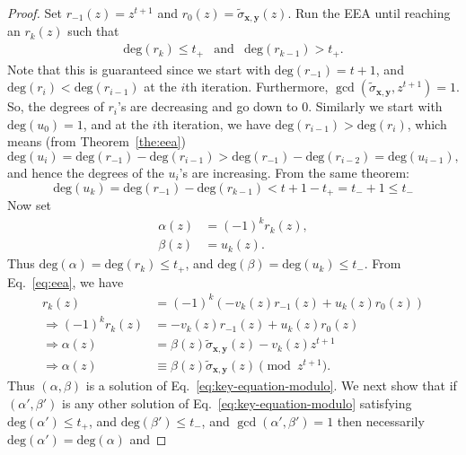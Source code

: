 \documentclass[pdflatex,sn-mathphys-num]{sn-jnl}
\theoremstyle{definition}
\newcommand{\vtr}[1]{\mathbf{#1}}
\begin{document}
 \begin{proof}
 Set $r_{-1}(z) = z^{t+1}$ and $r_0(z) = \tilde{\sigma}_{\vtr{x}, \vtr{y}}(z)$. Run the EEA until reaching an $r_k(z)$ such that
 \[
 \begin{matrix}
     \text{deg}(r_{k}) \leq t_+ & \text{and} & \text{deg}(r_{k-1}) > t_+. 
 \end{matrix}
 \]
 Note that this is guaranteed since we start with $\text{deg}(r_{-1}) = t+1$, and  $\text{deg}(r_{i})  < \text{deg}(r_{i-1})$  at the $i$th iteration. Furthermore, $\gcd(\tilde{\sigma}_{\vtr{x}, \vtr{y}}, z^{t+1}) = 1$. So, the degrees of $r_i$'s are decreasing and go down to 0. Similarly we start with $\text{deg}(u_{0}) = 1$, and at the $i$th iteration, we have $\text{deg}(r_{i-1}) > \text{deg}(r_{i})$, which means (from Theorem~\ref{the:eea})
 \[ 
    \text{deg}(u_{i}) = \text{deg}(r_{-1}) - \text{deg}(r_{i-1}) > \text{deg}(r_{-1}) - \text{deg}(r_{i-2}) =  \text{deg}(u_{i-1}),
\]
and hence the degrees of the $u_i$'s are increasing. From the same theorem: 
\begin{equation}
\label{eq:uk-less-than-tminus}
 \text{deg}(u_k) = \text{deg}(r_{-1}) - \text{deg}(r_{k-1}) < t + 1 - t_{+} = t_{-} + 1 \leq t_{-}   
\end{equation}
Now set 
 \begin{align}
     \alpha(z) &= (-1)^k r_k(z), \nonumber\\
     \beta(z) &= u_k(z) \label{eq:ab}.
 \end{align}
Thus $\text{deg}(\alpha) = \text{deg}(r_{k}) \leq t_+$, and $\text{deg}(\beta) = \text{deg}(u_{k}) \leq t_-$. From Eq.~\eqref{eq:eea}, we have
\begin{align}
    r_k(z) &= (-1)^k (-v_k(z)r_{-1}(z) + u_k(z) r_0(z)) \nonumber\\
\Rightarrow    (-1)^k r_k(z) &= -v_k(z)r_{-1}(z) + u_k(z) r_0(z) \nonumber\\
\Rightarrow   \alpha(z) &= \beta(z) \tilde{\sigma}_{\vtr{x}, \vtr{y}}(z) -v_k(z)z^{t+1}  \nonumber\\
\Rightarrow \alpha(z) &\equiv \beta(z) \tilde{\sigma}_{\vtr{x}, \vtr{y}}(z) \pmod{z^{t+1}}. \nonumber
\end{align}
Thus $(\alpha, \beta)$ is a solution of Eq.~\eqref{eq:key-equation-modulo}. We next show that if $(\alpha', \beta')$ is any other solution of Eq.~\eqref{eq:key-equation-modulo} satisfying $\text{deg}(\alpha') \leq t_+$, and $\text{deg}(\beta') \leq t_-$, and $\gcd(\alpha', \beta') = 1$ then necessarily $\text{deg}(\alpha') = \text{deg}(\alpha)$ and 

\end{proof}
\end{document}
